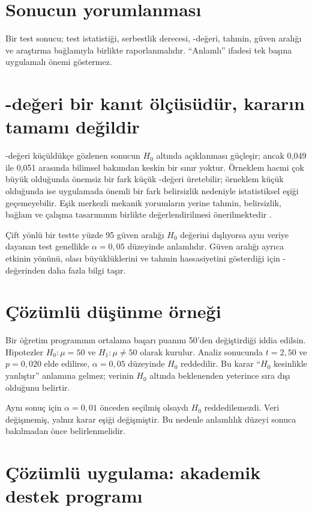 \section{Sonucun yorumlanması}
\label{sec:test-reporting}

Bir test sonucu; test istatistiği, serbestlik derecesi, \pval-değeri, tahmin,
güven aralığı ve araştırma bağlamıyla birlikte raporlanmalıdır. ``Anlamlı''
ifadesi tek başına uygulamalı önemi göstermez.

\section{\pval-değeri bir kanıt ölçüsüdür, kararın tamamı değildir}

\pval-değeri küçüldükçe gözlenen sonucun $H_0$ altında açıklanması güçleşir;
ancak 0,049 ile 0,051 arasında bilimsel bakımdan keskin bir sınır yoktur.
Örneklem hacmi çok büyük olduğunda önemsiz bir fark küçük \pval-değeri üretebilir;
örneklem küçük olduğunda ise uygulamada önemli bir fark belirsizlik nedeniyle
istatistiksel eşiği geçemeyebilir. Eşik merkezli mekanik yorumların yerine
tahmin, belirsizlik, bağlam ve çalışma tasarımının birlikte değerlendirilmesi
önerilmektedir \citep{wasserstein2019}.

Çift yönlü bir testte yüzde 95 güven aralığı $H_0$ değerini dışlıyorsa aynı
veriye dayanan test genellikle $\alpha=0{,}05$ düzeyinde anlamlıdır. Güven
aralığı ayrıca etkinin yönünü, olası büyüklüklerini ve tahmin hassasiyetini
gösterdiği için \pval-değerinden daha fazla bilgi taşır.

\section{Çözümlü düşünme örneği}

Bir öğretim programının ortalama başarı puanını 50'den değiştirdiği iddia
edilsin. Hipotezler $H_0:\mu=50$ ve $H_1:\mu\neq50$ olarak kurulur. Analiz
sonucunda $t=2{,}50$ ve $p=0{,}020$ elde edilirse, $\alpha=0{,}05$ düzeyinde
$H_0$ reddedilir. Bu karar ``$H_0$ kesinlikle yanlıştır'' anlamına gelmez;
verinin $H_0$ altında beklenenden yeterince sıra dışı olduğunu belirtir.

Aynı sonuç için $\alpha=0{,}01$ önceden seçilmiş olsaydı $H_0$ reddedilemezdi.
Veri değişmemiş, yalnız karar eşiği değişmiştir. Bu nedenle anlamlılık düzeyi
sonuca bakılmadan önce belirlenmelidir.

\section{Çözümlü uygulama: akademik destek programı}

